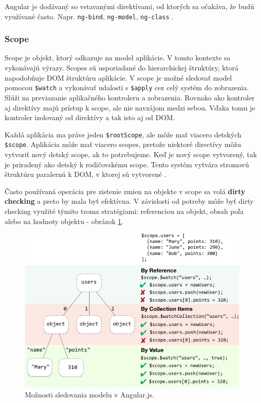 Angular je dodávaný so vstavanými direktívami, od ktorých sa očakáva, že budú využívané často. Napr. \verb|ng-bind|, \verb|ng-model|, \verb|ng-class| \cite{angular-docs}.

\subsubsection{Scope}
Scope je objekt, ktorý odkazuje na model aplikácie. V tomto kontexte sa vykonávajú výrazy. Scopes sú usporiadané do hierarchickej štruktúry, ktorá napodobňuje DOM štruktúru aplikácie. V scope je možné sledovať model pomocou \verb|$watch| a vykonávať udalosti s \verb|$apply| cez celý systém do zobrazenia. Slúži na previazanie aplikačného kontroleru a zobrazenia. Rovnako ako kontroler aj direktívy majú prístup k scope, ale nie navzájom medzi sebou. Vďaka tomu je kontroler izolovaný od direktívy a tak isto aj od DOM.

Každá aplikácia ma práve jeden \verb|$rootScope|, ale môže mať viacero detských \verb|$scope|. Aplikácia môže mať viacero scopes, pretože niektoré directívy môžu vytvoriť nový detský scope, ak to potrebujeme. Keď je nový scope vytvorený, tak je priradený ako detský k rodičovskému scope. Tento systém vytvára stromovú štruktúru paralernú k DOM, v ktorej sú vytvorené \cite{angular-docs}.

Často používaná operácia pre zistenie zmien na objekte v scope sa volá \textbf{dirty checking} a preto by mala byť efektívna. V závislosti od potreby môže byť dirty checking využité týmito troma stratégiami: referenciou na objekt, obsah poľa alebo na hodnoty objektu - obrázok \ref{img-angular-watch}.

\begin{figure}[H]
  \centering
  \includegraphics[scale=0.7]{img/angular/concepts-scope-watch-strategies.png}
  \caption{Možnosti sledovania modelu v Angular.js.}
  \label{img-angular-watch}
\end{figure}

